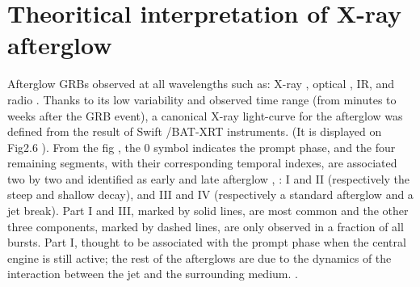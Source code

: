 \section{Theoritical interpretation of X-ray afterglow}
Afterglow GRBs  observed at all wavelengths such as: X-ray \citep{26}, optical \citep{27}, IR, and radio \citep{28}. Thanks to its low variability and observed time range (from minutes to weeks after the GRB event), a canonical X-ray light-curve for the afterglow was defined from the result of Swift /BAT-XRT instruments. (It is displayed on Fig2.6 ). From the fig , the 0 symbol indicates the prompt phase, and the four remaining segments, with their corresponding temporal indexes, are associated two by two and identified as early and late afterglow \citep{29},\citep{30}\citep{31} : I and II (respectively the steep and shallow decay), and III and IV (respectively a standard afterglow and a jet break). Part I and III, marked by solid lines, are most common and the other three components, marked by dashed lines, are only observed in a fraction of all bursts. Part I, thought to be associated with the prompt phase  when the central engine is still active; the rest of the afterglows are due to the dynamics of the interaction between the jet and the surrounding medium.\citep{6}\cite {15}\citep{18} \citep{32}.\\\\
